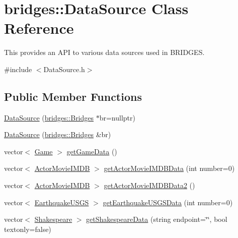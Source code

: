 \hypertarget{classbridges_1_1_data_source}{}\section{bridges\+::Data\+Source Class Reference}
\label{classbridges_1_1_data_source}


This provides an A\+PI to various data sources used in B\+R\+I\+D\+G\+ES.  




{\ttfamily \#include $<$Data\+Source.\+h$>$}

\subsection*{Public Member Functions}
\begin{DoxyCompactItemize}
\item 
\mbox{\hyperlink{classbridges_1_1_data_source_afc95b52d2ca03a92c1f1ee1594a097c7}{Data\+Source}} (\mbox{\hyperlink{classbridges_1_1_bridges}{bridges\+::\+Bridges}} $\ast$br=nullptr)
\item 
\mbox{\hyperlink{classbridges_1_1_data_source_a0da0dc59d798aa3266df7931a396a4c9}{Data\+Source}} (\mbox{\hyperlink{classbridges_1_1_bridges}{bridges\+::\+Bridges}} \&br)
\item 
vector$<$ \mbox{\hyperlink{classbridges_1_1_game}{Game}} $>$ \mbox{\hyperlink{classbridges_1_1_data_source_aa902e1dffd4169e2f6e6820299b8cde1}{get\+Game\+Data}} ()
\item 
vector$<$ \mbox{\hyperlink{classbridges_1_1_actor_movie_i_m_d_b}{Actor\+Movie\+I\+M\+DB}} $>$ \mbox{\hyperlink{classbridges_1_1_data_source_a664694136550312ab3f5a82bebb91bca}{get\+Actor\+Movie\+I\+M\+D\+B\+Data}} (int number=0)
\item 
vector$<$ \mbox{\hyperlink{classbridges_1_1_actor_movie_i_m_d_b}{Actor\+Movie\+I\+M\+DB}} $>$ \mbox{\hyperlink{classbridges_1_1_data_source_a00f0a0a1871d4864c6ccdd04195e0fb2}{get\+Actor\+Movie\+I\+M\+D\+B\+Data2}} ()
\item 
vector$<$ \mbox{\hyperlink{classbridges_1_1_earthquake_u_s_g_s}{Earthquake\+U\+S\+GS}} $>$ \mbox{\hyperlink{classbridges_1_1_data_source_a6645e2029915550fcac5f9fed7870119}{get\+Earthquake\+U\+S\+G\+S\+Data}} (int number=0)
\item 
vector$<$ \mbox{\hyperlink{classbridges_1_1_shakespeare}{Shakespeare}} $>$ \mbox{\hyperlink{classbridges_1_1_data_source_a7502065879fed9a952ba1cf0c0c74185}{get\+Shakespeare\+Data}} (string endpoint=\char`\"{}\char`\"{}, bool textonly=false)

\end{DoxyCompactItemize}
